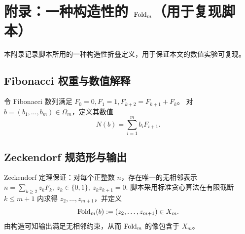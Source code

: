 \section{附录：一种构造性的 $\mathrm{Fold}_m$（用于复现脚本）}

本附录记录脚本所用的一种构造性折叠定义，用于保证本文的数值实验可复现。

\subsection{Fibonacci 权重与数值解释}

令 Fibonacci 数列满足 $F_0=0,F_1=1,F_{k+2}=F_{k+1}+F_k$。
对 $b=(b_1,\dots,b_m)\in\Omega_m$，定义其数值
$$
N(b)=\sum_{i=1}^{m} b_i F_{i+1}.
$$

\subsection{Zeckendorf 规范形与输出}

Zeckendorf 定理保证：对每个正整数 $n$，存在唯一的无相邻表示
$
n=\sum_{k\ge 2} z_k F_k,\ z_k\in\{0,1\},\ z_k z_{k+1}=0.
$
脚本采用标准贪心算法在有限截断 $k\le m+1$ 内求得 $z_2,\dots,z_{m+1}$，并定义
$$
\mathrm{Fold}_m(b):=(z_2,\dots,z_{m+1})\in X_m.
$$
由构造可知输出满足无相邻约束，从而 $\mathrm{Fold}_m$ 的像包含于 $X_m$。
